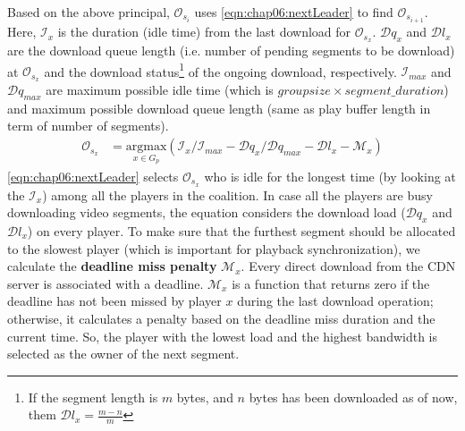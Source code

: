 Based on the above principal, $\mathcal{O}_{s_{i}}$ uses \eqn\ref{eqn:chap06:nextLeader} to find $\mathcal{O}_{s_{i+1}}$. Here, $\mathcal{I}_x$ is the duration (idle time) from the last download for $\mathcal{O}_{s_{x}}$. $\mathcal{D}{q_x}$ and $\mathcal{D}{l_x}$ are the download queue length (i.e. number of pending segments to be download) at $\mathcal{O}_{s_{x}}$ and the download status\footnote{If the segment length is $m$ bytes, and $n$ bytes has been downloaded as of now, them  $\mathcal{D}{l_x} = \frac{m-n}{m}$ } of the ongoing download, respectively. $\mathcal{I}_{max}$ and $\mathcal{D}q_{max}$ are maximum possible idle time (which is $groupsize\times segment\_duration$) and maximum possible download queue length (same as play buffer length in term of number of segments).
\begin{align}
\label{eqn:chap06:nextLeader}
\mathcal{O}_{s_{x}} &= \underset{x \in G_p}{\mathrm{argmax}} \left( {\mathcal{I}_x}/{\mathcal{I}_{max}} - {\mathcal{D}{q_x}}/{\mathcal{D}q_{max}} - \mathcal{D}{l_x} - \mathcal{M}_x \right)
\end{align}
\eqn\ref{eqn:chap06:nextLeader} selects $\mathcal{O}_{s_{x}}$ who is idle for the longest time (by looking at the $\mathcal{I}_x$) among all the players in the coalition. In case all the players are busy downloading video segments, the equation considers the download load ($\mathcal{D}{q_x}$ and $\mathcal{D}{l_x}$) on every player. To make sure that the furthest segment should be allocated to the slowest player (which is important for playback synchronization), we calculate the \textbf{deadline miss penalty} $\mathcal{M}_x$. Every direct download from the CDN server is associated with a deadline. $\mathcal{M}_x$ is a function that returns zero if the deadline has not been missed by player $x$ during the last download operation; otherwise, it calculates a penalty based on the deadline miss duration and the current time. So, the player with the lowest load and the highest bandwidth is selected as the owner of the next segment.


